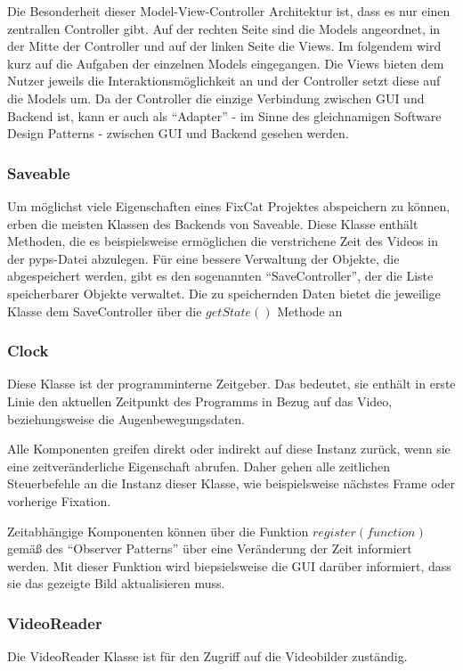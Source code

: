 \documentclass[a4paper,draft]{scrartcl}
\begin{document}
  Die Besonderheit dieser Model-View-Controller Architektur ist, dass es nur einen zentrallen Controller gibt. Auf der rechten Seite sind die Models angeordnet, in der Mitte der Controller und auf der linken Seite die Views. Im folgendem wird kurz auf die Aufgaben der einzelnen Models eingegangen. Die Views bieten dem Nutzer jeweils die Interaktionsmöglichkeit an und der Controller setzt diese auf die Models um. Da der Controller die einzige Verbindung zwischen GUI und Backend ist, kann er auch als "`Adapter"' - im Sinne des gleichnamigen Software Design Patterns - zwischen GUI und Backend gesehen werden. 

\subsubsection{Saveable}
Um möglichst viele Eigenschaften eines FixCat Projektes abspeichern zu können, erben die meisten Klassen des Backends von Saveable. Diese Klasse enthält Methoden, die es beispielsweise ermöglichen die verstrichene Zeit des Videos in der pyps-Datei abzulegen. 
Für eine bessere Verwaltung der Objekte, die abgespeichert werden, gibt es den sogenannten "`SaveController"', der die Liste speicherbarer Objekte verwaltet. 
Die zu speichernden Daten bietet die jeweilige Klasse dem SaveController über die $getState()$ Methode an

\subsubsection{Clock}
Diese Klasse ist der programminterne Zeitgeber. 
Das bedeutet, sie enthält in erste Linie den aktuellen Zeitpunkt des Programms in Bezug auf das Video, beziehungsweise die Augenbewegungsdaten.

Alle Komponenten greifen direkt oder indirekt auf diese Instanz zurück, wenn sie eine zeitveränderliche Eigenschaft abrufen. Daher gehen alle zeitlichen Steuerbefehle an die Instanz dieser Klasse, wie beispielsweise nächstes Frame oder vorherige Fixation. 

Zeitabhängige Komponenten können über die Funktion $register(function)$ gemäß des "`Observer Patterns"' über eine Veränderung der Zeit informiert werden.
Mit dieser Funktion wird biepsielsweise die GUI darüber informiert, dass sie das gezeigte Bild aktualisieren muss.

\subsubsection{VideoReader}
Die VideoReader Klasse ist für den Zugriff auf die Videobilder zuständig.
\end{document}
